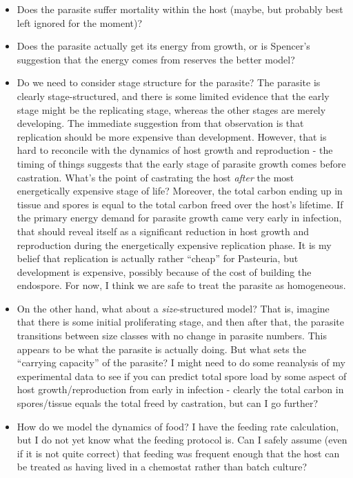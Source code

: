\documentclass[12pt,reqno,final,pdftex]{amsart}\usepackage[]{graphicx}\usepackage[]{color}
\theoremstyle{plain}
\numberwithin{equation}{part}
\begin{document}
\begin{itemize}
\item Does the parasite suffer mortality within the host (maybe, but probably best left ignored for the moment)?
\item Does the parasite actually get its energy from growth, or is Spencer's suggestion that the energy comes from reserves the better model?
\item Do we need to consider stage structure for the parasite? The parasite is clearly stage-structured, and there is some limited evidence that the early stage might be the replicating stage, whereas the other stages are merely developing. The immediate suggestion from that observation is that replication should be more expensive than development. However, that is hard to reconcile with the dynamics of host growth and reproduction - the timing of things suggests that the early stage of parasite growth comes before castration. What's the point of castrating the host \emph{after} the most energetically expensive stage of life? Moreover, the total carbon ending up in tissue and spores is equal to the total carbon freed over the host's lifetime. If the primary energy demand for parasite growth came very early in infection, that should reveal itself as a significant reduction in host growth and reproduction during the energetically expensive replication phase. It is my belief that replication is actually rather ``cheap'' for Pasteuria, but development is expensive, possibly because of the cost of building the endospore. For now, I think we are safe to treat the parasite as homogeneous.
\item On the other hand, what about a \emph{size}-structured model? That is, imagine that there is some initial proliferating stage, and then after that, the parasite transitions between size classes with no change in parasite numbers. This appears to be what the parasite is actually doing. But what sets the ``carrying capacity'' of the parasite? I might need to do some reanalysis of my experimental data to see if you can predict total spore load by some aspect of host growth/reproduction from early in infection - clearly the total carbon in spores/tissue equals the total freed by castration, but can I go further?
\item How do we model the dynamics of food? I have the feeding rate calculation, but I do not yet know what the feeding protocol is. Can I safely assume (even if it is not quite correct) that feeding was frequent enough that the host can be treated as having lived in a chemostat rather than batch culture?
\end{itemize}
\end{document}
